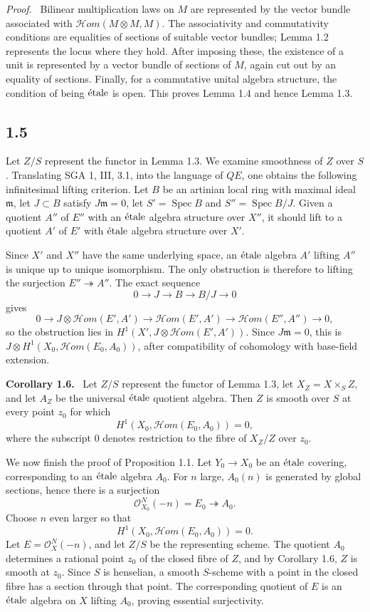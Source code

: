\documentclass[12pt]{article}
\newcommand{\Oo}{\mathcal{O}}
\newcommand{\Spec}{\operatorname{Spec}}
\newcommand{\etale}{\ifmmode\textnormal{\'etale}\else\'etale\fi}
\newcommand{\Hhom}{\mathcal{H}\!om}
\newenvironment{statement}[1]{\par\medskip\noindent\textbf{#1.}\ }{\par\medskip}
\newenvironment{prooftext}[1][Proof]{\par\noindent\emph{#1.}\ }{\par\medskip}
\begin{document}
\begin{prooftext}
Bilinear multiplication laws on \(M\) are represented by the vector bundle associated with \(\Hhom(M\otimes M,M)\). The associativity and commutativity conditions are equalities of sections of suitable vector bundles; Lemma 1.2 represents the locus where they hold. After imposing these, the existence of a unit is represented by a vector bundle of sections of \(M\), again cut out by an equality of sections. Finally, for a commutative unital algebra structure, the condition of being \(\etale\) is open. This proves Lemma 1.4 and hence Lemma 1.3.
\end{prooftext}

\subsection*{1.5}
Let \(Z/S\) represent the functor in Lemma 1.3. We examine smoothness of \(Z\) over \(S\). Translating SGA 1, III, 3.1, into the language of \(QE\), one obtains the following infinitesimal lifting criterion. Let \(B\) be an artinian local ring with maximal ideal \(\mathfrak m\), let \(J\subset B\) satisfy \(J\mathfrak m=0\), let \(S'=
\Spec B\) and \(S''=\Spec B/J\). Given a quotient \(A''\) of \(E''\) with an \(\etale\) algebra structure over \(X''\), it should lift to a quotient \(A'\) of \(E'\) with \(\etale\) algebra structure over \(X'\).

Since \(X'\) and \(X''\) have the same underlying space, an \(\etale\) algebra \(A'\) lifting \(A''\) is unique up to unique isomorphism. The only obstruction is therefore to lifting the surjection \(E''\twoheadrightarrow A''\). The exact sequence
\[
0\to J\to B\to B/J\to0
\]
gives
\[
0\to J\otimes\Hhom(E',A')\to \Hhom(E',A')\to \Hhom(E'',A'')\to0,
\]
so the obstruction lies in \(H^1(X',J\otimes\Hhom(E',A'))\). Since \(J\mathfrak m=0\), this is \(J\otimes H^1(X_0,\Hhom(E_0,A_0))\), after compatibility of cohomology with base-field extension.

\begin{statement}{Corollary 1.6}
Let \(Z/S\) represent the functor of Lemma 1.3, let \(X_Z=X\times_SZ\), and let \(A_Z\) be the universal \(\etale\) quotient algebra. Then \(Z\) is smooth over \(S\) at every point \(z_0\) for which
\[
H^1(X_0,\Hhom(E_0,A_0))=0,
\]
where the subscript \(0\) denotes restriction to the fibre of \(X_Z/Z\) over \(z_0\).
\end{statement}

We now finish the proof of Proposition 1.1. Let \(Y_0\to X_0\) be an \(\etale\) covering, corresponding to an \(\etale\) algebra \(A_0\). For \(n\) large, \(A_0(n)\) is generated by global sections, hence there is a surjection
\[
\Oo_{X_0}^{N}(-n)=E_0\twoheadrightarrow A_0.
\]
Choose \(n\) even larger so that
\[
H^1(X_0,\Hhom(E_0,A_0))=0.
\]
Let \(E=\Oo_X^{N}(-n)\), and let \(Z/S\) be the representing scheme. The quotient \(A_0\) determines a rational point \(z_0\) of the closed fibre of \(Z\), and by Corollary 1.6, \(Z\) is smooth at \(z_0\). Since \(S\) is henselian, a smooth \(S\)-scheme with a point in the closed fibre has a section through that point. The corresponding quotient of \(E\) is an \(\etale\) algebra on \(X\) lifting \(A_0\), proving essential surjectivity.
\end{document}
